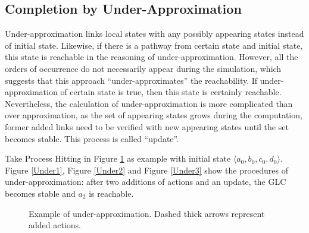 \subsection{Completion by Under-Approximation}
Under-approximation links local states with any possibly appearing states instead of initial state. Likewise, if there is a pathway from certain state and initial state, this state is reachable in the reasoning of under-approximation. However, all the orders of occurrence do not necessarily appear during the simulation, which suggests that this approach ``under-approximates'' the reachability. If under-approximation of certain state is true, then this state is certainly reachable. Nevertheless, the calculation of under-approximation is more complicated than over approximation, as the set of appearing states grows during the computation, former added links need to be verified with new appearing states until the set becomes stable. This process is called ``update''. \par
Take Process Hitting in Figure \ref{ExUnder} as example with initial state $\langle a_0,b_0,c_0,d_0\rangle$. Figure \ref{Under1}, Figure \ref{Under2} and Figure \ref{Under3} show the procedures of under-approximation: after two additions of actions and an update, the GLC becomes stable and $a_2$ is reachable.
\begin{figure}[!htbp]
\centering
{}
\caption{Example of under-approximation. Dashed thick arrows represent added actions.}\label{ExUnder}
\end{figure}
